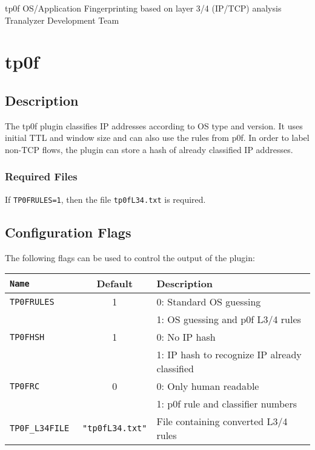 \documentclass[documentation]{subfiles}
\begin{document}
\trantitle
    {tp0f} %
    {OS/Application Fingerprinting based on layer 3/4 (IP/TCP) analysis} %
    {Tranalyzer Development Team} %

\section{tp0f}\label{s:tp0f}

\subsection{Description}
The tp0f plugin classifies IP addresses according to OS type and version.
It uses initial TTL and window size and can also use the rules from p0f.
In order to label non-TCP flows, the plugin can store a hash of already classified IP addresses.

\subsubsection{Required Files}
If {\tt TP0FRULES=1}, then the file {\tt tp0fL34.txt} is required.

\subsection{Configuration Flags}
The following flags can be used to control the output of the plugin:

\begin{longtable}{>{\tt}lcl}
    \toprule
    {\bf Name}    & {\bf Default}             & {\bf Description}\\
    \midrule\endhead%
    TP0FRULES     & 1                         & 0: Standard OS guessing\\
                  &                           & 1: OS guessing and p0f L3/4 rules\\
    TP0FHSH       & 1                         & 0: No IP hash\\
                  &                           & 1: IP hash to recognize IP already classified\\
    TP0FRC        & 0                         & 0: Only human readable\\
                  &                           & 1: p0f rule and classifier numbers\\
    TP0F\_L34FILE & {\tt\small "tp0fL34.txt"} & File containing converted L3/4 rules\\
    \bottomrule
\end{longtable}
\end{document}
